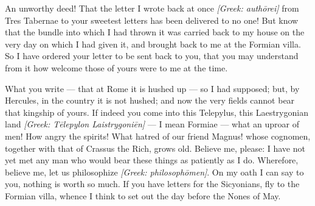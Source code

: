 

 An unworthy deed! That the letter I wrote back at once \textit{[Greek: auth\=orei]} from Tres Tabernae to your sweetest letters has been delivered to no one! But know that the bundle into which I had thrown it was carried back to my house on the very day on which I had given it, and brought back to me at the Formian villa. So I have ordered your letter to be sent back to you, that you may understand from it how welcome those of yours were to me at the time.

 What you write --- that at Rome it is hushed up --- so I had supposed; but, by Hercules, in the country it is not hushed; and now the very fields cannot bear that kingship of yours. If indeed you come into this Telepylus, this Laestrygonian land \textit{[Greek: T\=elepylon Laistrygoni\=en]} --- I mean Formiae --- what an uproar of men! How angry the spirits! What hatred of our friend Magnus! whose cognomen, together with that of Crassus the Rich, grows old. Believe me, please: I have not yet met any man who would bear these things as patiently as I do. Wherefore, believe me, let us philosophize \textit{[Greek: philosoph\=omen]}. On my oath I can say to you, nothing is worth so much. If you have letters for the Sicyonians, fly to the Formian villa, whence I think to set out the day before the Nones of May.
